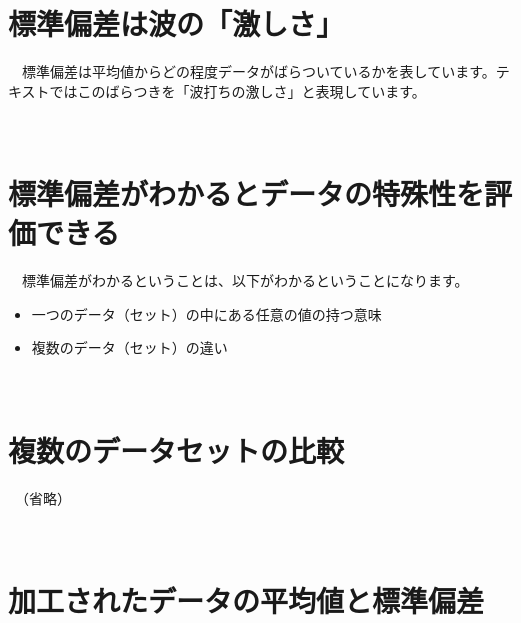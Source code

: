 \documentclass[
  12pt,
]{book}
\providecommand{\tightlist}{%
  \setlength{\itemsep}{0pt}\setlength{\parskip}{0pt}}
\begin{document}
\hypertarget{ux6a19ux6e96ux504fux5deeux306fux6ce2ux306eux6fc0ux3057ux3055}{%
\section{標準偏差は波の「激しさ」}\label{ux6a19ux6e96ux504fux5deeux306fux6ce2ux306eux6fc0ux3057ux3055}}

　標準偏差は平均値からどの程度データがばらついているかを表しています。テキストではこのばらつきを「波打ちの激しさ」と表現しています。

　

\hypertarget{ux6a19ux6e96ux504fux5deeux304cux308fux304bux308bux3068ux30c7ux30fcux30bfux306eux7279ux6b8aux6027ux3092ux8a55ux4fa1ux3067ux304dux308b}{%
\section{標準偏差がわかるとデータの特殊性を評価できる}\label{ux6a19ux6e96ux504fux5deeux304cux308fux304bux308bux3068ux30c7ux30fcux30bfux306eux7279ux6b8aux6027ux3092ux8a55ux4fa1ux3067ux304dux308b}}

　標準偏差がわかるということは、以下がわかるということになります。

\begin{itemize}
\tightlist
\item
  一つのデータ（セット）の中にある任意の値の持つ意味
\item
  複数のデータ（セット）の違い
\end{itemize}

　

\hypertarget{ux8907ux6570ux306eux30c7ux30fcux30bfux30bbux30c3ux30c8ux306eux6bd4ux8f03}{%
\section{複数のデータセットの比較}\label{ux8907ux6570ux306eux30c7ux30fcux30bfux30bbux30c3ux30c8ux306eux6bd4ux8f03}}

　（省略）

　

\hypertarget{ux52a0ux5de5ux3055ux308cux305fux30c7ux30fcux30bfux306eux5e73ux5747ux5024ux3068ux6a19ux6e96ux504fux5dee}{%
\section{加工されたデータの平均値と標準偏差}\label{ux52a0ux5de5ux3055ux308cux305fux30c7ux30fcux30bfux306eux5e73ux5747ux5024ux3068ux6a19ux6e96ux504fux5dee}}
\end{document}
